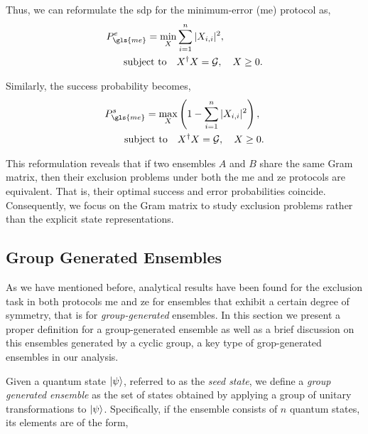 \documentclass[12pt,letterpaper]{article}
\begin{document}
Thus, we can reformulate the \gls{sdp} for the minimum-error (\gls{me}) protocol as,
\begin{align*}
	P_{\gls{me}}^e = \min_{X} &\sum_{i=1}^n |X_{i,i}|^2, \\
	\text{subject to} \quad & X^\dagger X = \mathcal{G}, \quad X \geq 0.
\end{align*}

Similarly, the success probability becomes,
\begin{align*}
	P_{\gls{me}}^s = \max_{X} &\left( 1 - \sum_{i=1}^n |X_{i,i}|^2 \right), \\
	\text{subject to} \quad & X^\dagger X = \mathcal{G}, \quad X \geq 0.
\end{align*}

This reformulation reveals that if two ensembles $A$ and $B$ share the same Gram matrix, then their exclusion problems under both the \gls{me} and \gls{ze} protocols are equivalent. That is, their optimal success and error probabilities coincide. Consequently, we focus on the Gram matrix to study exclusion problems rather than the explicit state representations.


\subsection{Group Generated Ensembles}\label{sectionGroupGeneratedEnsemble}

\hspace{20pt}As we have mentioned before, analytical results have been found for the exclusion task in both protocols \gls{me} and \gls{ze} for ensembles that exhibit a certain degree of symmetry\cite{MainPaper}, that is for \emph{group-generated} ensembles. In this section we present a proper definition for a group-generated ensemble as well as a brief discussion on this ensembles generated by a cyclic group, a key type of grop-generated ensembles in our analysis.

Given a quantum state $\ket{\psi}$, referred to as the \emph{seed state}, we define a \emph{group generated ensemble} as the set of states obtained by applying a group of unitary transformations to $\ket{\psi}$. Specifically, if the ensemble consists of $n$ quantum states, its elements are of the form,
\end{document}
